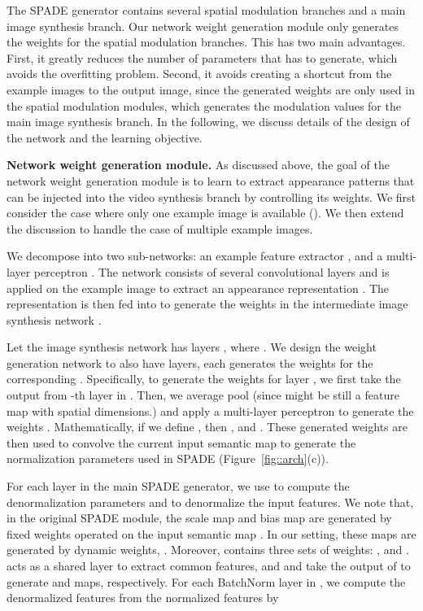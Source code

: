 \documentclass{article}
\begin{document}
The SPADE generator contains several spatial modulation branches and a main image synthesis branch. Our network weight generation module  only generates the weights for the spatial modulation branches. This has two main advantages. First, it greatly reduces the number of parameters that  has to generate, which avoids the overfitting problem. Second, it avoids creating a shortcut from the example images to the output image, since the generated weights are only used in the spatial modulation modules, which generates the modulation values for the main image synthesis branch. In the following, we discuss details of the design of the network  and the learning objective.

{\bf Network weight generation module.} As discussed above, the goal of the network weight generation module  is to learn to extract appearance patterns that can be injected into the video synthesis branch by controlling its weights. We first consider the case where only one example image is available (). We then extend the discussion to handle the case of multiple example images.

We decompose  into two sub-networks: an example feature extractor , and a multi-layer perceptron . The network  consists of several convolutional layers and is applied on the example image  to extract an appearance representation . The representation  is then fed into  to generate the weights  in the intermediate image synthesis network .

Let the image synthesis network  has  layers , where . We design the weight generation network  to also have  layers, each  generates the weights for the corresponding . Specifically, to generate the weights  for layer , we first take the output  from -th layer in . Then, we average pool  (since  might be still a feature map with spatial dimensions.) and apply a multi-layer perceptron  to generate the weights .  Mathematically, if we define , then , and .
These generated weights are then used to convolve the current input semantic map  to generate the normalization parameters used in SPADE (Figure~\ref{fig::arch}(c)).

For each layer in the main SPADE generator, we use  to compute the denormalization parameters  and  to denormalize the input features. We note that, in the original SPADE module, the scale map  and bias map  are generated by fixed weights operated on the input semantic map . In our setting, these maps are generated by dynamic weights, .
Moreover,  contains three sets of weights: ,  and .
 acts as a shared layer to extract common features, and  and  take the output of  to generate  and  maps, respectively.
For each BatchNorm layer in , we compute the denormalized features  from the normalized features  by 
\end{document}

